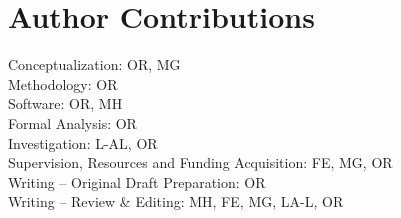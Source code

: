 \documentclass[9pt,lineno]{RandlettLab_elife}
\begin{document}
\section{Author Contributions}

Conceptualization: OR, MG \\
Methodology: OR \\
Software: OR, MH \\
Formal Analysis: OR \\ 
Investigation: L-AL, OR \\
Supervision, Resources and Funding Acquisition: FE, MG, OR \\
Writing – Original Draft Preparation: OR \\
Writing – Review & Editing: MH, FE, MG, LA-L, OR \\



\end{document}

